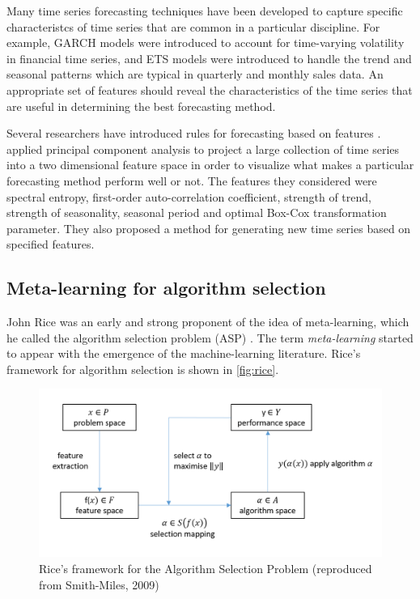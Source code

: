 \documentclass[11pt,a4paper,]{article}
\theoremstyle{definition}
\theoremstyle{definition}
\theoremstyle{definition}
\theoremstyle{remark}
\begin{document}
Many time series forecasting techniques have been developed to capture
specific characteristcs of time series that are common in a particular
discipline. For example, GARCH models were introduced to account for
time-varying volatility in financial time series, and ETS models were
introduced to handle the trend and seasonal patterns which are typical
in quarterly and monthly sales data. An appropriate set of features
should reveal the characteristics of the time series that are useful in
determining the best forecasting method.

Several researchers have introduced rules for forecasting based on
features \autocites{collopy1992rule}{adya2001automatic}{wang2009rule}.
\textcite{kang2017visualising} applied principal component analysis to
project a large collection of time series into a two dimensional feature
space in order to visualize what makes a particular forecasting method
perform well or not. The features they considered were spectral entropy,
first-order auto-correlation coefficient, strength of trend, strength of
seasonality, seasonal period and optimal Box-Cox transformation
parameter. They also proposed a method for generating new time series
based on specified features.

\subsection{Meta-learning for algorithm
selection}\label{meta-learning-for-algorithm-selection}

John Rice was an early and strong proponent of the idea of
meta-learning, which he called the algorithm selection problem (ASP)
\autocite{rice1976}. The term \emph{meta-learning} started to appear
with the emergence of the machine-learning literature. Rice's framework
for algorithm selection is shown in \autoref{fig:rice}.

\begin{figure}

{\centering \includegraphics[width=0.8\linewidth]{figures/RiceFramework} 

}

\caption{Rice's framework for the Algorithm Selection Problem (reproduced from Smith-Miles, 2009)}\label{fig:rice}
\end{figure}
\end{document}
